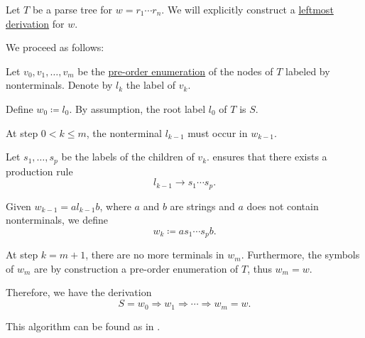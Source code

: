 \begin{algorithm}\label{alg:parse_tree_to_leftmost_derivation}
  Let \( T \) be a parse tree for \( w = r_1 \cdots r_n \). We will explicitly construct a \hyperref[def:leftmost_derivation]{leftmost derivation} for \( w \).

  We proceed as follows:
  \begin{thmenum}
     Let \( v_0, v_1, \ldots, v_m \) be the \hyperref[def:ordered_tree_enumeration]{pre-order enumeration} of the nodes of \( T \) labeled by nonterminals. Denote by \( l_k \) the label of \( v_k \).

    Define \( w_0 \coloneqq l_0 \). By assumption, the root label \( l_0 \) of \( T \) is \( S \).

     At step \( 0 < k \leq m \), the nonterminal \( l_{k-1} \) must occur in \( w_{k-1} \).

    Let \( s_1, \ldots, s_p \) be the labels of the children of \( v_k \).  ensures that there exists a production rule
    \begin{equation*}
      l_{k-1} \to s_1 \cdots s_p.
    \end{equation*}

    Given \( w_{k-1} = a l_{k-1} b \), where \( a \) and \( b \) are strings and \( a \) does not contain nonterminals, we define
    \begin{equation*}
      w_k \coloneqq a s_1 \cdots s_p b.
    \end{equation*}

     At step \( k = m + 1 \), there are no more terminals in \( w_m \). Furthermore, the symbols of \( w_m \) are by construction a pre-order enumeration of \( T \), thus \( w_m = w \).

    Therefore, we have the derivation
    \begin{equation*}
      S = w_0 \Rightarrow w_1 \Rightarrow \cdots \Rightarrow w_m = w.
    \end{equation*}
  \end{thmenum}
\end{algorithm}
\begin{comments}
  \item This algorithm can be found as  in \cite{notebook:code}.
\end{comments}

